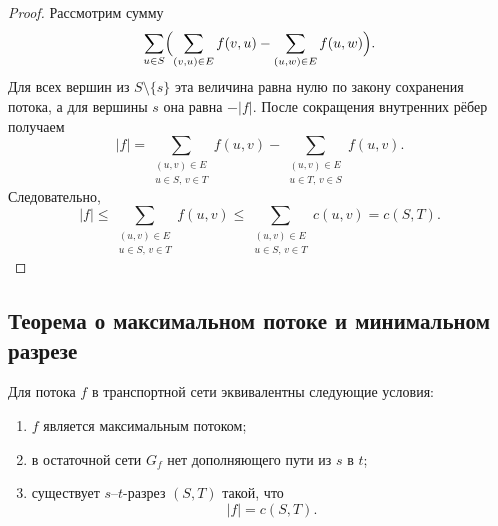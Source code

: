 \begin{proof}
	Рассмотрим сумму
	\[
	\sum_{u\in S}
	\Bigl(
	\sum_{(v,u)\in E} f(v,u)
	-
	\sum_{(u,w)\in E} f(u,w)
	\Bigr).
	\]
	Для всех вершин из $S\setminus\{s\}$ эта величина равна нулю по закону сохранения потока, а для вершины $s$ она равна $-|f|$. После сокращения внутренних рёбер получаем
	\[
	|f|=
	\sum_{\substack{(u,v)\in E\\ u\in S,\, v\in T}} f(u,v)
	-
	\sum_{\substack{(u,v)\in E\\ u\in T,\, v\in S}} f(u,v).
	\]
	Следовательно,
	\[
	|f|
	\le
	\sum_{\substack{(u,v)\in E\\ u\in S,\, v\in T}} f(u,v)
	\le
	\sum_{\substack{(u,v)\in E\\ u\in S,\, v\in T}} c(u,v)
	=
	c(S,T).
	\]
\end{proof}

\subsection{Теорема о максимальном потоке и минимальном разрезе}

\begin{Theorem}{}{}
	Для потока $f$ в транспортной сети эквивалентны следующие условия:
	\begin{enumerate}[label=\arabic*)]
		\item $f$ является максимальным потоком;
		\item в остаточной сети $G_f$ нет дополняющего пути из $s$ в $t$;
		\item существует $s$--$t$-разрез $(S,T)$ такой, что
		\[
		|f|=c(S,T).
		\]
	\end{enumerate}
\end{Theorem}

